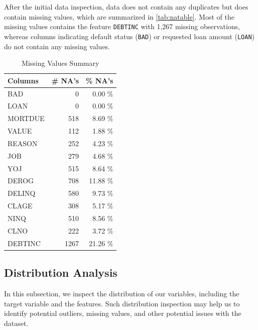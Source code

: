 After the initial data inspection, data does not contain any duplicates but does contain missing values, which are summarized in \autoref{tab:natable}. Most of the missing values contains the feature \texttt{DEBTINC} with 1,267 missing observations, whereas columns indicating default status (\texttt{BAD}) or requested loan amount (\texttt{LOAN}) do not contain any missing values.

\begin{table}[H]
    \small
    \setlength{\tabcolsep}{8pt}
    \renewcommand{\arraystretch}{1.3}
    \centering
        \caption[Missing Values Summary]{Missing Values Summary}\label{tab:natable}
    \begin{tabular}{l r r}
    \toprule
    \textbf{Columns} & \textbf{\# NA's} & \textbf{\% NA's}\\
    \midrule
    \hline
    BAD & 0 & 0.00 \% \\
LOAN & 0 & 0.00 \% \\
MORTDUE & 518 & 8.69 \% \\
VALUE & 112 & 1.88 \% \\
REASON & 252 & 4.23 \% \\
JOB & 279 & 4.68 \% \\
YOJ & 515 & 8.64 \% \\
DEROG & 708 & 11.88 \% \\
DELINQ & 580 & 9.73 \% \\
CLAGE & 308 & 5.17 \% \\
NINQ & 510 & 8.56 \% \\
CLNO & 222 & 3.72 \% \\
DEBTINC & 1267 & 21.26 \% \\
\hline
    \bottomrule
    \end{tabular}
    \vspace{0.35em}

    \vspace{-1em}
\end{table}


\subsection{Distribution Analysis}
In this subsection, we inspect the distribution of our variables, including the target variable and the features.
Such distribution inspection may help us to identify potential outliers, missing values, and other potential issues with the dataset.

